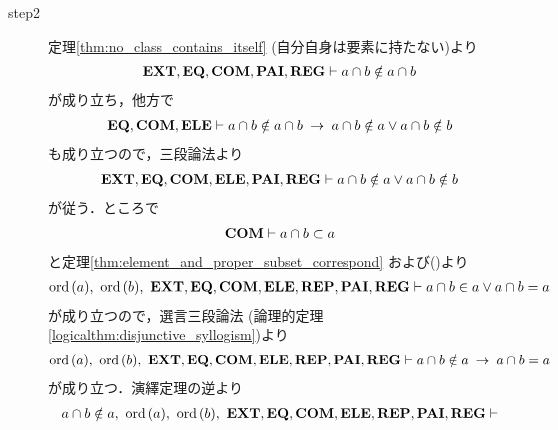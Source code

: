 \begin{sketch}
\begin{description}
			\item[step2] 
				定理\ref{thm:no_class_contains_itself} (自分自身は要素に持たない)より
				\begin{align}
					\mbox{{\bf EXT}},\mbox{{\bf EQ}},\mbox{\bf COM},\mbox{{\bf PAI}},\mbox{{\bf REG}} \vdash a \cap b \notin a \cap b
				\end{align}
				が成り立ち，他方で
				\begin{align}
					\mbox{{\bf EQ}},\mbox{\bf COM},\mbox{{\bf ELE}} \vdash a \cap b \notin a \cap b
					\hspace{0.25em}\rightarrow\hspace{0.25em} a \cap b \notin a \vee a \cap b \notin b
				\end{align}
				も成り立つので，三段論法より
				\begin{align}
					\mbox{{\bf EXT}},\mbox{{\bf EQ}},\mbox{\bf COM},\mbox{{\bf ELE}},\mbox{{\bf PAI}},\mbox{{\bf REG}} \vdash 
					a \cap b \notin a \vee a \cap b \notin b
					\label{fom:ON_is_totally_ordered_2}
				\end{align}
				が従う．ところで
				\begin{align}
					\mbox{\bf COM} \vdash a \cap b \subset a
				\end{align}
				と定理\ref{thm:element_and_proper_subset_correspond}
				および()より
				\begin{align}
					\ord{a},\ \ord{b},\ \EXTAX,\EQAX,\COMAX,\ELEAX,\REPAX,\PAIAX,\REGAX \vdash 
					a \cap b \in a \vee a \cap b = a
				\end{align}
				が成り立つので，選言三段論法
				(論理的定理\ref{logicalthm:disjunctive_syllogism})より
				\begin{align}
					\ord{a},\ \ord{b},\ \EXTAX,\EQAX,\COMAX,\ELEAX,\REPAX,\PAIAX,\REGAX \vdash 
					a \cap b \notin a \rarrow a \cap b = a
				\end{align}
				が成り立つ．演繹定理の逆より
				\begin{align}
					a \cap b \notin a,\ \ord{a},\ \ord{b},\ \EXTAX,\EQAX,\COMAX,\ELEAX,\REPAX,\PAIAX,\REGAX \vdash 

\end{align}
\end{description}
\end{sketch}
